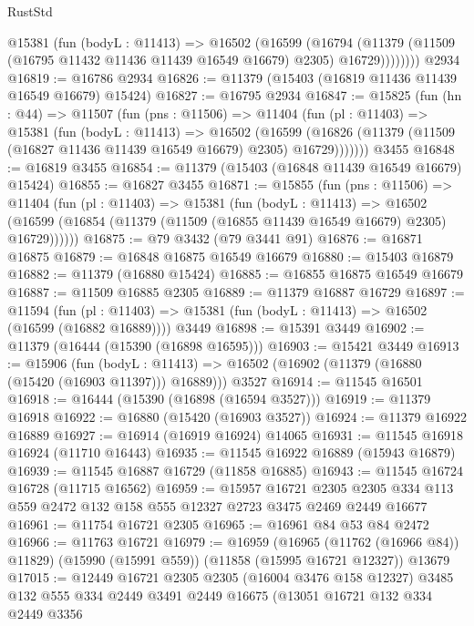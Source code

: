 \begin{lexlean}{RustStd}
\begin{coremodule}
          @15381
            (fun (bodyL : @11413) =>
            @16502
              (@16599
                (@16794
                  (@11379 (@11509 (@16795 @11432 @11436 @11439 @16549 @16679) @2305) @16729))))))))
    @2934
@16819 := @16786 @2934
@16826 := @11379 (@15403 (@16819 @11436 @11439 @16549 @16679) @15424)
@16827 := @16795 @2934
@16847 := @15825
    (fun (hn : @44) =>
    @11507
      (fun (pns : @11506) =>
      @11404
        (fun (pl : @11403) =>
        @15381
          (fun (bodyL : @11413) =>
          @16502
            (@16599
              (@16826 (@11379 (@11509 (@16827 @11436 @11439 @16549 @16679) @2305) @16729)))))))
    @3455
@16848 := @16819 @3455
@16854 := @11379 (@15403 (@16848 @11439 @16549 @16679) @15424)
@16855 := @16827 @3455
@16871 := @15855
    (fun (pns : @11506) =>
    @11404
      (fun (pl : @11403) =>
      @15381
        (fun (bodyL : @11413) =>
        @16502 (@16599 (@16854 (@11379 (@11509 (@16855 @11439 @16549 @16679) @2305) @16729))))))
@16875 := @79 @3432 (@79 @3441 @91)
@16876 := @16871 @16875
@16879 := @16848 @16875 @16549 @16679
@16880 := @15403 @16879
@16882 := @11379 (@16880 @15424)
@16885 := @16855 @16875 @16549 @16679
@16887 := @11509 @16885 @2305
@16889 := @11379 @16887 @16729
@16897 := @11594
    (fun (pl : @11403) => @15381 (fun (bodyL : @11413) => @16502 (@16599 (@16882 @16889))))
    @3449
@16898 := @15391 @3449
@16902 := @11379 (@16444 (@15390 (@16898 @16595)))
@16903 := @15421 @3449
@16913 := @15906
    (fun (bodyL : @11413) => @16502 (@16902 (@11379 (@16880 (@15420 (@16903 @11397))) @16889)))
    @3527
@16914 := @11545 @16501
@16918 := @16444 (@15390 (@16898 (@16594 @3527)))
@16919 := @11379 @16918
@16922 := @16880 (@15420 (@16903 @3527))
@16924 := @11379 @16922 @16889
@16927 := @16914 (@16919 @16924) @14065
@16931 := @11545 @16918 @16924 (@11710 @16443)
@16935 := @11545 @16922 @16889 (@15943 @16879)
@16939 := @11545 @16887 @16729 (@11858 @16885)
@16943 := @11545 @16724 @16728 (@11715 @16562)
@16959 := @15957
    @16721
    @2305
    @2305
    @334
    @113
    @559
    @2472
    @132
    @158
    @555
    @12327
    @2723
    @3475
    @2469
    @2449
    @16677
@16961 := @11754 @16721 @2305
@16965 := @16961 @84 @53 @84 @2472
@16966 := @11763 @16721
@16979 := @16959
    (@16965 (@11762 (@16966 @84)) @11829)
    (@15990 (@15991 @559))
    (@11858 (@15995 @16721 @12327))
    @13679
@17015 := @12449
    @16721
    @2305
    @2305
    (@16004 @3476 @158 @12327)
    @3485
    @132
    @555
    @334
    @2449
    @3491
    @2449
    @16675
    (@13051
      @16721
      @132
      @334
      @2449
      @3356

\end{coremodule}
\end{lexlean}
